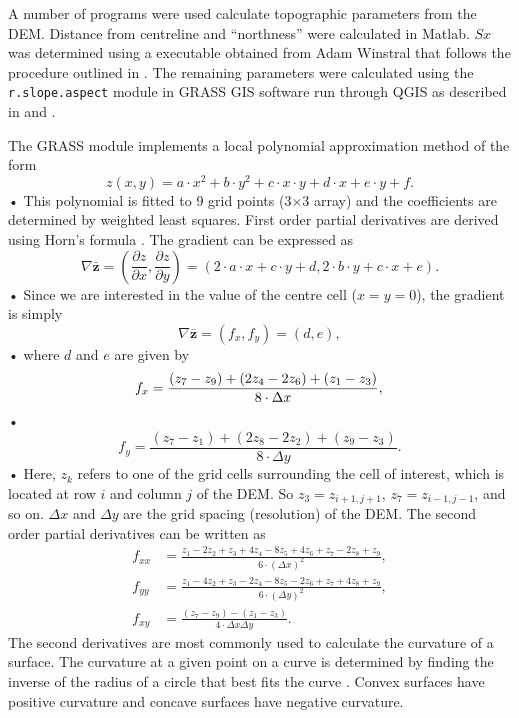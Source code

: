 \documentclass[12pt]{article}
\begin{document}
A number of programs were used calculate topographic parameters from the DEM. Distance from centreline and ``northness'' were calculated in Matlab. $Sx$ was determined using a executable obtained from Adam Winstral that follows the procedure outlined in \cite{Winstral2002}. The remaining parameters were calculated using the \texttt{r.slope.aspect} module in GRASS GIS software run through QGIS as described in \cite{Mitavsova1993} and \cite{Hofierka2009}. 

The GRASS module implements a local polynomial approximation method of the form 
\begin{equation}
z(x,y) = a\cdot x^2 +b\cdot y^2 +c \cdot x\cdot y +d \cdot x + e\cdot y +f.
\end{equation}•
This polynomial is fitted to 9 grid points (3$\times$3 array) and the coefficients are determined by weighted least squares. 
First order partial derivatives are derived using Horn's formula \citep{Horn1981, Neteler2013}. The gradient can be expressed as
\begin{equation}
\nabla \bar{ \bm{z}} = \left( \frac{\partial z}{\partial x}, \frac{\partial z}{\partial y} \right) = \left( 2 \cdot a  \cdot x + c  \cdot y +d, 2 \cdot b  \cdot y + c  \cdot x + e \right) .
\end{equation}•
Since we are interested in the value of the centre cell ($x=y=0$), the gradient is simply 
\begin{equation}
\nabla \bar{ \bm{z}} = (f_x,f_y) = (d,e),
\end{equation}•
where $d$ and $e$ are given by
\begin{equation}
f_x = \frac{(z_7-z_9)+(2z_4-2z_6)+(z_1-z_3)}{8 \cdot \Delta x},\\
\end{equation}•
\begin{equation}
f_y = \frac{(z_7-z_1)+(2z_8-2z_2)+(z_9-z_3)}{8 \cdot \Delta y}.
\end{equation}•
Here, $z_k$ refers to one of the grid cells surrounding the cell of interest, which is located at row $i$ and column $j$ of the DEM. So $z_3 = z_{i+1,j+1}$, $z_7 = z_{i-1,j-1}$, and so on. $\Delta x$ and $\Delta y$ are the grid spacing (resolution) of the DEM. The second order partial derivatives can be written as \citep{Hofierka2009, Neteler2013}
\begin{align}
f_{xx} &= \frac{z_1-2z_2+z_3+4z_4-8z_5+4z_6+z_7-2z_8+z_9}{6 \cdot (\Delta x)^2},\\
f_{yy} &= \frac{z_1-4z_2+z_3-2z_4-8z_5-2z_6+z_7+4z_8+z_9}{6 \cdot (\Delta y)^2},\\
f_{xy} &= \frac{(z_7-z_9)-(z_1-z_3)}{4 \cdot \Delta x \Delta y}.
\end{align}
The second derivatives are most commonly used to calculate the curvature of a surface. The curvature at a given point on a curve is determined by finding the inverse of the radius of a circle that best fits the curve \citep{Olaya2009}. Convex surfaces have positive curvature and concave surfaces have negative curvature. 
\end{document}
